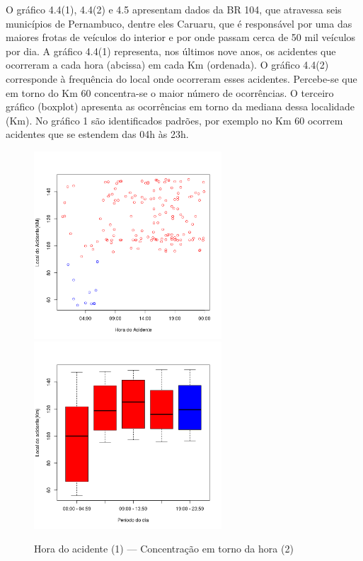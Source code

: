 O gráfico 4.4(1), 4.4(2) e 4.5 apresentam dados da BR 104, que atravessa seis municípios de Pernambuco, dentre eles Caruaru, que é responsável por uma das maiores frotas de veículos do interior e por onde passam cerca de 50 mil veículos por dia. 
A gráfico 4.4(1) representa, nos últimos nove anos, os acidentes que ocorreram a cada hora (abcissa) em cada Km (ordenada).
O  gráfico 4.4(2) corresponde à frequência do local onde ocorreram esses acidentes. 
Percebe-se que em torno do Km 60 concentra-se o maior número de ocorrências. 
O terceiro gráfico (boxplot) apresenta as ocorrências em torno da mediana dessa localidade (Km). 
No gráfico 1 são identificados padrões, por exemplo no Km 60 ocorrem acidentes que se estendem das 04h às 23h. 


\pagebreak

\begin{figure}[h]
	\caption{Hora do acidente (1) --- Concentração em torno da hora (2) }
	\includegraphics[width=7cm,height=7cm]{Figuras/Preprocess/br110_1.png}
	\includegraphics[width=7cm,height=7cm]{Figuras/Preprocess/br110_2.png}

\end{figure}


